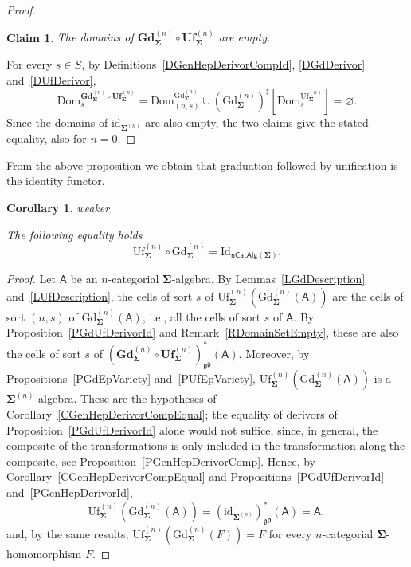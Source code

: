 \documentclass[a4paper, reqno]{amsbook}
\makeatletter
\newcommand{\sig}[1]{\mathbf{#1}}             %
\newcommand{\calg}[1]{\boldsymbol{\mathsf{#1}}} %
\newcommand{\Dom}{\mathrm{Dom}}
\newcommand{\gd}{\mathfrak{gd}}              %
\newcommand{\id}{\mathrm{id}}
\newcommand{\Id}{\mathrm{Id}}
\newcommand{\Gd}{\mathrm{Gd}}
\newcommand{\Uf}{\mathrm{Uf}}
\newcommand{\bGd}{\mathbf{Gd}}
\newcommand{\bUf}{\mathbf{Uf}}
\theoremstyle{plain}
\newtheorem{corollary}[theorem]{Corollary}
\newtheorem{claim}[theorem]{Claim}
\theoremstyle{definition}
\newcommand*{\CA@leanpending}{}
\newcommand*{\CA@leanrelation}{}
\newcommand*{\lean}[2]{%
  \ifcsname\string\color@lean@#1\endcsname\else
    \PackageError{main}{Unknown relation `#1' in \string\lean}{Use equivalent, weaker or stronger.}%
  \fi
  \gdef\CA@leanrelation{#1}%
  \gdef\CA@leanpending{#2}}
\makeatother
\begin{document}
\begin{proof}
\begin{claim}\label{ClGdUfDerivorIdB}
The domains of $\bGd^{(n)}_{\sig{\Sigma}}\circ\bUf^{(n)}_{\sig{\Sigma}}$ are empty.
\end{claim}
For every $s\in S$, by Definitions~\ref{DGenHepDerivorCompId}, \ref{DGdDerivor} and~\ref{DUfDerivor},
\[
\Dom^{\bGd^{(n)}_{\sig{\Sigma}}\circ\bUf^{(n)}_{\sig{\Sigma}}}_s
=\Dom^{\Gd^{(n)}_{\sig{\Sigma}}}_{(n,s)}
 \cup(\Gd^{(n)}_{\sig{\Sigma}})^{\sharp}\left[\Dom^{\Uf^{(n)}_{\sig{\Sigma}}}_s\right]
=\varnothing.
\]
Since the domains of $\id_{\sig{\Sigma}^{(n)}}$ are also empty, the two claims give the stated equality, also for $n=0$.
\end{proof}

From the above proposition we obtain that graduation followed by unification is the identity functor.

\begin{corollary}\label{CUfGdId}\lean{weaker}{Presentations.homogeneousPresentationRoundTrip}
The following equality holds
$$
\Uf^{(n)}_{\sig{\Sigma}}\circ\Gd^{(n)}_{\sig{\Sigma}}=\Id_{\mathsf{nCatAlg}(\sig{\Sigma})}.
$$
\end{corollary}
\begin{proof}
Let $\calg{A}$ be an $n$-categorial $\sig{\Sigma}$-algebra.
By Lemmas~\ref{LGdDescription} and~\ref{LUfDescription}, the cells of sort $s$ of $\Uf^{(n)}_{\sig{\Sigma}}(\Gd^{(n)}_{\sig{\Sigma}}(\calg{A}))$ are the cells of sort $(n,s)$ of $\Gd^{(n)}_{\sig{\Sigma}}(\calg{A})$, i.e., all the cells of sort $s$ of $\calg{A}$.
By Proposition~\ref{PGdUfDerivorId} and Remark~\ref{RDomainSetEmpty}, these are also the cells of sort $s$ of $(\bGd^{(n)}_{\sig{\Sigma}}\circ\bUf^{(n)}_{\sig{\Sigma}})^{\ast}_{\gd}(\calg{A})$.
Moreover, by Propositions~\ref{PGdEpVariety} and~\ref{PUfEpVariety}, $\Uf^{(n)}_{\sig{\Sigma}}(\Gd^{(n)}_{\sig{\Sigma}}(\calg{A}))$ is a $\sig{\Sigma}^{(n)}$-algebra.
These are the hypotheses of Corollary~\ref{CGenHepDerivorCompEqual}; the equality of derivors of Proposition~\ref{PGdUfDerivorId} alone would not suffice, since, in general, the composite of the transformations is only included in the transformation along the composite, see Proposition~\ref{PGenHepDerivorComp}.
Hence, by Corollary~\ref{CGenHepDerivorCompEqual} and Propositions~\ref{PGdUfDerivorId} and~\ref{PGenHepDerivorId},
$$
\Uf^{(n)}_{\sig{\Sigma}}\left(\Gd^{(n)}_{\sig{\Sigma}}(\calg{A})\right)
=\left(\id_{\sig{\Sigma}^{(n)}}\right)^{\ast}_{\gd}(\calg{A})
=\calg{A},
$$
and, by the same results, $\Uf^{(n)}_{\sig{\Sigma}}(\Gd^{(n)}_{\sig{\Sigma}}(F))=F$ for every $n$-categorial $\sig{\Sigma}$-homomorphism $F$.
\end{proof}
\end{document}

